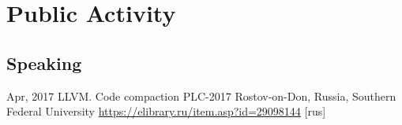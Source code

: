\documentclass[11pt,a4paper]{moderncv}
\newcommand{\EngRus}[2]{#1}
\newcommand{\BirthPlaceOfValour}{\EngRus{Rostov-on-Don, Russia}{Ростов-на-Дону, Россия}}
\begin{document}
\section{\EngRus{Public Activity}{Публичная деятельность}}
  \subsection{\EngRus{Speaking}{Конференции}}
    \cventry
      {\EngRus{Apr}{Апрель}, 2017}
      {\EngRus{LLVM. Code compaction}{Преобразование по уплотнению кода в LLVM}}
      {\EngRus{PLC-2017}{Языки программирования и компиляторы 2017}}
      {\BirthPlaceOfValour, \EngRus{Southern Federal University}{Южный Федеральный Университет}}
      {\newline\url{https://elibrary.ru/item.asp?id=29098144} \EngRus{[rus]}{}}
      {}{}
\end{document}

